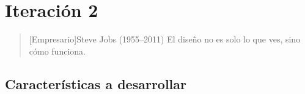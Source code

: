 \chapter{Iteración 2}

\begin{quotation}[Empresario]{Steve Jobs (1955--2011)}
El diseño no es solo lo que ves, sino cómo funciona.
\end{quotation}

\begin{abstract}
En este capítulo reflejaremos todos y cada uno de los costes que se han de reflejar a la hora de desarrollar el proyecto así como la relación de funcionalidades que se desarrollan con estos costes.
\end{abstract}

\section{Características a desarrollar}

